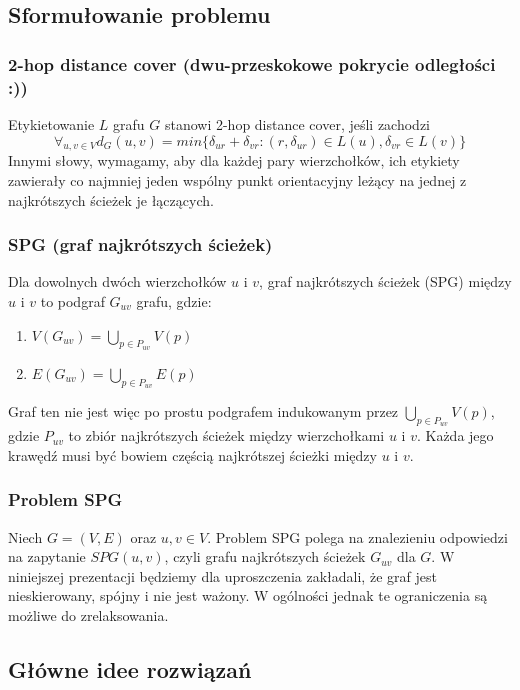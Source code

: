\documentclass{article}
\theoremstyle{definition}
\begin{document}
    \subsection{Sformułowanie problemu}

        \subsubsection*{2-hop distance cover (dwu-przeskokowe pokrycie odległości :))}
            Etykietowanie $L$ grafu $G$ stanowi 2-hop distance cover, jeśli zachodzi 
            \[
                \forall_{u,v \in V} d_G(u, v) = min\{\delta_{ur} + \delta_{vr} : (r, \delta_{ur}) \in L(u), \delta_{vr} \in L(v)\}    
            \]
            Innymi słowy, wymagamy, aby dla każdej pary wierzchołków, ich etykiety zawierały co najmniej jeden wspólny punkt orientacyjny leżący na jednej z najkrótszych ścieżek je łączących. 
    
        \subsubsection*{SPG (graf najkrótszych ścieżek)}
            Dla dowolnych dwóch wierzchołków $u$ i $v$, graf najkrótszych ścieżek (SPG) między $u$ i $v$ to podgraf $G_{uv}$ grafu, gdzie:
            \begin{enumerate}
                \item $V(G_{uv}) = \bigcup_{p \in P_{uv}} V(p)$
                \item $E(G_{uv}) = \bigcup_{p \in P_{uv}} E(p)$
            \end{enumerate}
            Graf ten nie jest więc po prostu podgrafem indukowanym przez $\bigcup_{p \in P_{uv}} V(p)$, gdzie $P_{uv}$ to zbiór najkrótszych ścieżek między wierzchołkami $u$ i $v$. Każda jego krawędź musi być bowiem częścią najkrótszej ścieżki między $u$ i $v$. 

        \subsubsection*{Problem SPG}
            Niech $G = (V, E)$ oraz $u,v \in V$. Problem SPG polega na znalezieniu odpowiedzi na zapytanie $SPG(u,v)$, czyli grafu najkrótszych ścieżek $G_{uv}$ dla $G$. W niniejszej prezentacji będziemy dla uproszczenia zakładali, że graf jest nieskierowany, spójny i nie jest ważony. W ogólności jednak te ograniczenia są możliwe do zrelaksowania. 
            
    \subsection{Główne idee rozwiązań}
\end{document}

